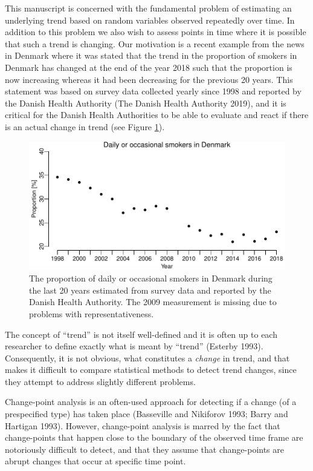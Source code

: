 \documentclass[11pt,]{article}
\theoremstyle{nonumberplain}
\begin{document}
This manuscript is concerned with the fundamental problem of estimating
an underlying trend based on random variables observed repeatedly over
time. In addition to this problem we also wish to assess points in time
where it is possible that such a trend is changing. Our motivation is a
recent example from the news in Denmark where it was stated that the
trend in the proportion of smokers in Denmark has changed at the end of
the year 2018 such that the proportion is now increasing whereas it had
been decreasing for the previous 20 years. This statement was based on
survey data collected yearly since 1998 and reported by the Danish
Health Authority (The Danish Health Authority 2019), and it is critical
for the Danish Health Authorities to be able to evaluate and react if
there is an actual change in trend (see Figure \ref{fig:rawDataPlot}).

\begin{figure}[htb]
\center\includegraphics{../figures/rawDataPlot}
\caption{The proportion of daily or occasional smokers in Denmark during the last 20 years estimated from survey data and reported by the Danish Health Authority. The 2009 measurement is missing due to problems with representativeness.}
\label{fig:rawDataPlot}
\end{figure}

The concept of ``trend'' is not itself well-defined and it is often up
to each researcher to define exactly what is meant by ``trend'' (Esterby
1993). Consequently, it is not obvious, what constitutes a \emph{change}
in trend, and that makes it difficult to compare statistical methods to
detect trend changes, since they attempt to address slightly different
problems.

Change-point analysis is an often-used approach for detecting if a
change (of a prespecified type) has taken place (Basseville and
Nikiforov 1993; Barry and Hartigan 1993). However, change-point analysis
is marred by the fact that change-points that happen close to the
boundary of the observed time frame are notoriously difficult to detect,
and that they assume that change-points are abrupt changes that occur at
specific time point.
\end{document}
